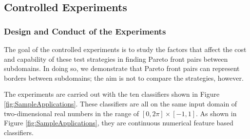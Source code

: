 \documentclass[preprint,1p,authoryear,times]{elsarticle}
\begin{document}
\subsection{Controlled Experiments}\label{sec:Experiments}


\subsubsection{Design and Conduct of the Experiments}

The goal of the controlled experiments is to study the factors that affect the cost and capability of these test strategies in finding Pareto front pairs between subdomains. In doing so, we demonstrate that Pareto front pairs can represent borders between subdomains; the aim is not to compare the strategies, however.

The experiments are carried out with the ten classifiers shown in Figure \ref{fig:SampleApplications}. These classifiers are all on the same input domain of two-dimensional real numbers in the range of $[0,2\pi]\times [-1,1]$. As shown in Figure \ref{fig:SampleApplications}, they are continuous numerical feature based classifiers. 
   
\end{document}
